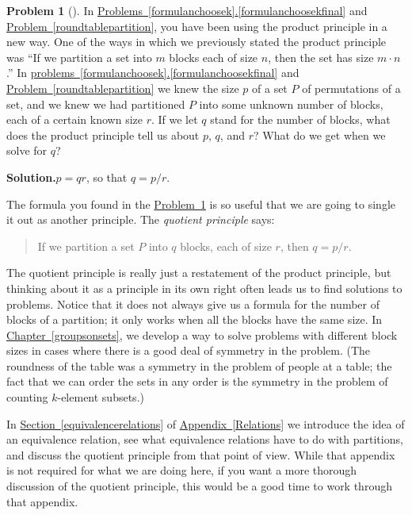 \documentclass[10pt,]{book}
\theoremstyle{plain}
\theoremstyle{definition}
\newtheorem{activity}[project]{Problem}
\theoremstyle{definition}
\numberwithin{equation}{chapter}
\begin{document}
\begin{activity}[]\label{quotientprinciple}
In \hyperref[formulanchoosekfinal]{Problems~\ref{formulanchoosek}.\ref{formulanchoosekfinal}} and \hyperref[roundtablepartition]{Problem~\ref{roundtablepartition}}, you have been using the product principle in a new way. One of the ways in which we previously stated the product principle was ``If we partition a set into \(m\) blocks each of size \(n\), then the set has size \(m\cdot n\).'' In \hyperref[formulanchoosekfinal]{problems~\ref{formulanchoosek}.\ref{formulanchoosekfinal}} and \hyperref[roundtablepartition]{Problem~\ref{roundtablepartition}} we knew the size \(p\) of a set \(P\) of permutations of a set, and we knew we had partitioned \(P\) into some unknown number of blocks, each of a certain known size \(r\). If we let \(q\) stand for the number of blocks, what does the product principle tell us about \(p\), \(q\), and \(r\)? What do we get when we solve for \(q\)?%
\par\medskip\noindent%
\textbf{Solution.}\quad \(p=qr\), so that \(q=p/r\).%
\end{activity}
The formula you found in the \hyperref[quotientprinciple]{Problem~\ref{quotientprinciple}} is so useful that we are going to single it out as another principle. The \emph{quotient principle} says:%
\begin{quote}\hypertarget{blockquote-4}{}
If we partition a set \(P\) into \(q\) blocks, each of size \(r\), then \(q=p/r.\)%
\end{quote}
The quotient principle is really just a restatement of the product principle, but thinking about it as a principle in its own right often leads us to find solutions to problems. Notice that it does not always give us a formula for the number of blocks of a partition; it only works when all the blocks have the same size. In \hyperref[groupsonsets]{Chapter~\ref{groupsonsets}}, we develop a way to solve problems with different block sizes in cases where there is a good deal of symmetry in the problem. (The roundness of the table was a symmetry in the problem of people at a table; the fact that we can order the sets in any order is the symmetry in the problem of counting \(k\)-element subsets.)%
\par
In \hyperref[equivalencerelations]{Section~\ref{equivalencerelations}} of \hyperref[Relations]{Appendix~\ref{Relations}} we introduce the idea of an equivalence relation, see what equivalence relations have to do with partitions, and discuss the quotient principle from that point of view. While that appendix is not required for what we are doing here, if you want a more thorough discussion of the quotient principle, this would be a good time to work through that appendix.%
\end{document}
